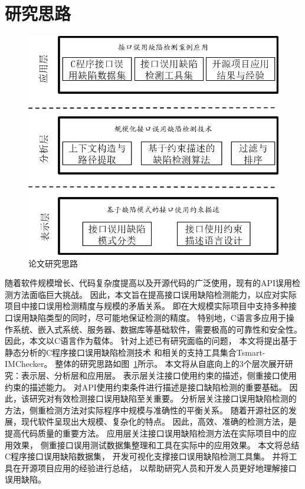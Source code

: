 \section{研究思路}

\begin{figure}[t]
	\centering
	\includegraphics[width=0.85\linewidth]{figures/cp1-overview.png}
	\caption{
		论文研究思路
	}
	\label{fig:1-3-overview}
\end{figure}

随着软件规模增长、代码复杂度提高以及开源代码的广泛使用，现有的API误用检测方法面临巨大挑战。
因此，本文旨在提高接口误用缺陷检测能力，以应对实际项目中接口误用检测精度与规模的矛盾关系。
即在大规模实际项目中支持多种接口误用缺陷类型的同时，尽可能地保证检测的精度。
特别地，C语言多应用于操作系统、嵌入式系统、服务器、数据库等基础软件，需要极高的可靠性和安全性。
因此，本文以C语言作为载体。
针对上述已有研究面临的问题，
本文将提出基于静态分析的C程序接口误用缺陷检测技术
和相关的支持工具集合Tsmart-IMChecker。
整体的研究思路如图~\ref{fig:1-3-overview}所示。
本文将从自底向上的3个层次展开研究：表示层、分析层和应用层。
表示层关注接口使用约束的描述，侧重接口使用约束的描述能力。
对API使用约束条件进行描述是接口缺陷检测的重要基础。
因此，该研究对有效检测接口误用缺陷至关重要。
分析层关注接口误用缺陷检测的方法，侧重检测方法对实际程序中规模与准确性的平衡关系。
随着开源社区的发展，现代软件呈现出大规模、复杂化的特点。
因此，高效、准确的检测方法，是提高代码质量的重要方法。
应用层关注接口误用缺陷检测方法在实际项目中的应用效果，
侧重接口误用测试数据集整理和工具在实际中的应用效果。
本文将总结C程序接口误用缺陷数据集，
开发可视化支撑接口误用缺陷检测工具集。
并将工具在开源项目应用的经验进行总结，
以帮助研究人员和开发人员更好地理解接口误用缺陷。

